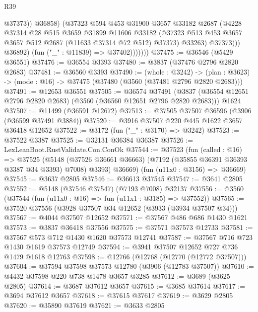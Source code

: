 \begin{lexlean}{R39}
\begin{coremodule}
                            @37373))
                        @36858)
                      (@37323
                        @594
                        @453
                        @31900
                        @3657
                        @33182
                        @2687
                        (@4228
                          @37314
                          @28
                          @515
                          @3659
                          @31899
                          @11606
                          @33182
                          (@37323 @513 @453 @3657 @3657 @512 @2687 (@11633 @37314 @72 @512) @37373)
                          @33263)
                        @37373)))
                  @36892)
                (fun ("_" : @11839) => @37402)))))))
@37475 := @36546 (@5429 @36551)
@37476 := @36554 @3393
@37480 := @3837 (@37476 @2796 @2820 @2683)
@37481 := @36560 @3393
@37490 := (whole : @3242) ->
  (plan : @3623) -> (mode : @16) -> @37475 (@37480 (@3560 (@37481 @2796 @2820 @2683)))
@37491 := @12653 @36551
@37505 := @36574
    @37491
    (@3837 (@36554 @12651 @2796 @2820 @2683) (@3560 (@36560 @12651 @2796 @2820 @2683)))
    @1624
@37507 := @11499 (@36591 @12672)
@37513 := @37505 @37507 @36596 (@3906 (@36599 @37491 @3884))
@37520 := @3916 @37507 @220 @445 @1622 @3657 @36418 @12652
@37522 := @3172 (fun ("_" : @3170) => @3242)
@37523 := @37522 @3387
@37525 := @32131 @36384 @36387
@37526 := LexLeanBoot.RustValidate.Con.ConOk
@37544 := @37523
    (fun (called : @16) =>
    @37525
      (@5148 (@37526 @36661 @36663) (@7192 (@35855 @36391 @36393 @3387 @34 @3393) @7008) @3393)
      @36669)
    (fun (u11x0 : @3156) => @36669)
@37545 := @3637 @2805
@37546 := @36613 @37545
@37547 := @3641 @2805
@37552 := @5148 (@37546 @37547) (@7193 @7008) @32137
@37556 := @3560 (@37544 (fun (u11x0 : @16) => fun (u11x1 : @3185) => @37552))
@37565 := @37520 @37556 (@3928 @37507 @34 @12652 (@3933 (@3934 @37507 @34)))
@37567 := @4044 @37507 @12652
@37571 := @37567 @486 @686 @1430 @1621
@37573 := @3837 @36418 @37556
@37575 := @37571 @37573 @12733
@37581 := @37567 @573 @712 @1430 @1620 @37573 @12741
@37587 := @37567 @716 @723 @1430 @1619 @37573 @12749
@37594 := @3941 @37507 @12652 @727 @736 @1479 @1618 @12763
@37598 := @12766 (@12768 (@12770 (@12772 @37507)))
@37604 := @37594 @37598 @37573 @12780 (@3906 (@12783 @37507))
@37610 := @4432 @37598 @220 @738 @1478 @3657 @3285
@37612 := @3689 (@3625 @2805)
@37614 := @3687 @37612 @3657
@37615 := @3685 @37614
@37617 := @3694 @37612 @3657
@37618 := @37615 @37617
@37619 := @3629 @2805
@37620 := @35890 @37619
@37621 := @3633 @2805

\end{coremodule}
\end{lexlean}
